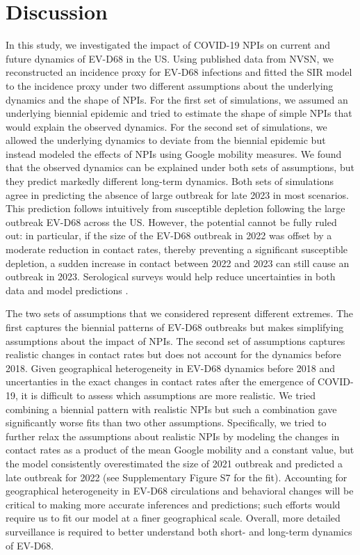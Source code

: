 \documentclass[12pt]{article}
\begin{document}
\section{Discussion}

In this study, we investigated the impact of COVID-19 NPIs on current and future dynamics of EV-D68 in the US.
Using published data from NVSN, we reconstructed an incidence proxy for EV-D68 infections and fitted the SIR model to the incidence proxy under two different assumptions about the underlying dynamics and the shape of NPIs.
For the first set of simulations, we assumed an underlying biennial epidemic and tried to estimate the shape of simple NPIs that would explain the observed dynamics.
For the second set of simulations, we allowed the underlying dynamics to deviate from the biennial epidemic but instead modeled the effects of NPIs using Google mobility measures.
We found that the observed dynamics can be explained under both sets of assumptions, but they predict markedly different long-term dynamics.
Both sets of simulations agree in predicting the absence of large outbreak for late 2023 in most scenarios.
This prediction follows intuitively from susceptible depletion following the large outbreak EV-D68 across the US.
However, the potential cannot be fully ruled out:
in particular, if the size of the EV-D68 outbreak in 2022 was offset by a moderate reduction in contact rates, thereby preventing a significant susceptible depletion, a sudden increase in contact between 2022 and 2023 can still cause an outbreak in 2023.
Serological surveys would help reduce uncertainties in both data and model predictions \citep{nguyen2022enterovirus}.

The two sets of assumptions that we considered represent different extremes.
The first captures the biennial patterns of EV-D68 outbreaks but makes simplifying assumptions about the impact of NPIs.
The second set of assumptions captures realistic changes in contact rates but does not account for the dynamics before 2018.
Given geographical heterogeneity in EV-D68 dynamics before 2018 and uncertanties in the exact changes in contact rates after the emergence of COVID-19, it is difficult to assess which assumptions are more realistic.
We tried combining a biennial pattern with realistic NPIs but such a combination gave significantly worse fits than two other assumptions.
Specifically, we tried to further relax the assumptions about realistic NPIs by modeling the changes in contact rates as a product of the mean Google mobility and a constant value, but the model consistently overestimated the size of 2021 outbreak and predicted a late outbreak for 2022 (see Supplementary Figure S7 for the fit).
Accounting for geographical heterogeneity in EV-D68 circulations and behavioral changes will be critical to making more accurate inferences and predictions;
such efforts would require us to fit our model at a finer geographical scale.
Overall, more detailed surveillance is required to better understand both short- and long-term dynamics of EV-D68.
\end{document}
